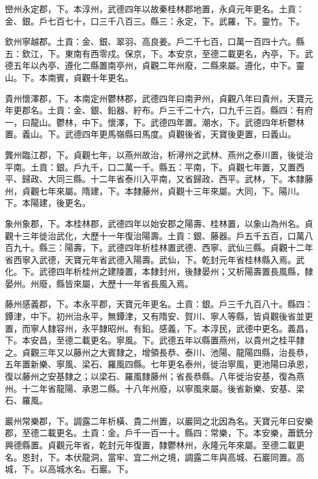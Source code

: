 \begin{pinyinscope}
 巒州永定郡，下。本淳州，武德四年以故秦桂林郡地置，永貞元年更名。土貢：金、銀。戶七百七十，口三千八百三。縣三：永定，下。武羅，下。靈竹。下。



 欽州寧越郡。土貢：金、銀、翠羽、高良姜。戶二千七百，口萬一百四十六。縣五：欽江，下。東南有西零戍。保京，下。本安京，至德二載更名，內亭，下。武德五年以內亭、遵化二縣置南亭州，貞觀二年州廢，二縣來屬。遵化，中下。靈山。下。本南賓，貞觀十年更名。



 貴州懷澤郡，下。本南定州鬱林郡，武德四年曰南尹州，貞觀八年曰貴州，天寶元年更郡名。土貢：金、銀、鉛器、紵布。戶三千二十六，口九千三百。縣四：有府一，曰龍山。鬱林，中下。懷澤，下。武德四年置。潮水，下。武德四年析鬱林置。義山。下。武德四年更馬嶺縣曰馬度。貞觀後省，天寶後更置，曰義山。



 龔州臨江郡，下。貞觀七年，以燕州故治，析潯州之武林、燕州之泰川置，後徙治平南。土貢：銀。戶九千，口二萬一千。縣五：平南，下。貞觀七年置，又置西平、歸政、大同三縣。十二年省泰川入平南，又省歸政、西平。武林，下。本隸藤州，貞觀七年來屬。隋建，下。本隸藤州，貞觀十三年來屬。大同，下。陽川。下。本陽建，後更名。



 象州象郡，下。本桂林郡，武德四年以始安郡之陽壽、桂林置，以象山為州名。貞觀十三年徙治武化，大歷十一年復治陽壽。土貢：銀、藤器。戶五千五百，口萬八百九十。縣三：陽壽，下。武德四年析桂林置武德、西寧、武仙三縣。貞觀十二年省西寧入武德，天寶元年省武德入陽壽。武仙，下。乾封元年省桂林縣入焉。武化。下。武德四年析桂州之建陵置，本隸封州，後隸晏州；又析陽壽置長風縣，隸晏州。州廢，縣皆來屬，大歷十一年省長風入焉。



 藤州感義郡，下。本永平郡，天寶元年更名。土貢：銀。戶三千九百八十。縣四：鐔津，中下。初州治永平，無鐔津，又有隋安、賀川、寧人等縣，皆貞觀後省並更置，而寧人隸容州，永平隸昭州。有鉛。感義，下。本淳民，武德中更名。義昌，下。本安昌，至德二載更名。寧風。下。武德五年以縣置燕州，以貴州之桂平隸之。貞觀三年又以藤州之大賓隸之，增領長恭、泰川、池陽、龍陽四縣，治長恭，五年置新樂、寧風、梁石、羅風四縣。七年更名泰州，徙治寧風，更池陽曰承恩，復以藤州之安基隸之；以梁石、羅風隸藤州；省長恭縣。八年徙治安基，復為燕州。十二年省龍陽、承恩二縣。十八年州廢，以寧風來屬。後省新樂、安基、梁石、羅風。



 巖州常樂郡，下。調露二年析橫、貴二州置，以巖岡之北因為名。天寶元年曰安樂郡，至德二載更名。土貢：金。戶千一百一十。縣四：常樂，下。本安樂，蕭銑分興德縣置。貞觀元年省，乾封元年復置，隸鬱林州，永隆元年來屬。至德二載更名。恩封，下。本伏龍洞，當牢、宜二州之境，調露二年與高城、石巖同置。高城，下。以高城水名。石巖。下。




\end{pinyinscope}
